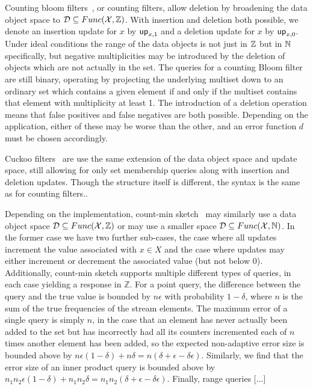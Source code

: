 Counting bloom filters~\cite{xxx}, or counting filters, allow deletion by broadening the data object space to $\mathcal{D} \subseteq Func(\mathcal{X},\mathbb{Z})$. With insertion and deletion both possible, we denote an insertion update for $x$ by $\mathsf{up}_{x,1}$ and a deletion update for $x$ by $\mathsf{up}_{x,0}$. Under ideal conditions the range of the data objects is not just in $\mathbb{Z}$ but in $\mathbb{N}$ specifically, but negative multiplicities may be introduced by the deletion of objects which are not actually in the set. The queries for a counting Bloom filter are still binary, operating by projecting the underlying multiset down to an ordinary set which contains a given element if and only if the multiset contains that element with multiplicity at least 1. The introduction of a deletion operation means that false positives and false negatives are both possible. Depending on the application, either of these may be worse than the other, and an error function $d$ must be chosen accordingly.

Cuckoo filters~\cite{xxx} are use the same extension of the data object space and update space, still allowing for only set membership queries along with insertion and deletion updates. Though the structure itself is different, the syntax is the same as for counting filters..

Depending on the implementation, count-min sketch~\cite{xxx} may similarly use a data object space $\mathcal{D} \subseteq Func(\mathcal{X},\mathbb{Z})$ or may use a smaller space $\mathcal{D} \subseteq Func(\mathcal{X},\mathbb{N})$. In the former case we have two further sub-cases, the case where all updates increment the value associated with $x \in X$ and the case where updates may either increment or decrement the associated value (but not below 0). Additionally, count-min sketch supports multiple different types of queries, in each case yielding a response in $\mathbb{Z}$. For a point query, the difference between the query and the true value is bounded by $n\epsilon$ with probability $1-\delta$, where $n$ is the sum of the true frequencies of the stream elements. The maximum error of a single query is simply $n$, in the case that an element has never actually been added to the set but has incorrectly had all its counters incremented each of $n$ times another element has been added, so the expected non-adaptive error size is bounded above by $n\epsilon(1-\delta)+n\delta = n(\delta+\epsilon-\delta\epsilon)$.  Similarly, we find that the error size of an inner product query is bounded above by $n_1n_2\epsilon(1-\delta)+n_1n_2\delta = n_1n_2(\delta+\epsilon-\delta\epsilon)$. Finally, range queries [...]

